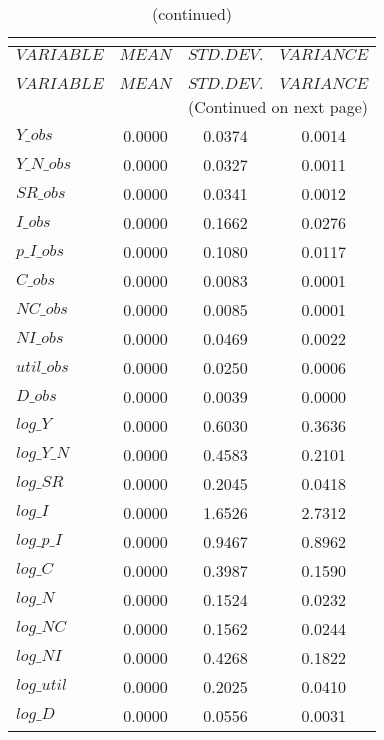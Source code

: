  
\begin{center}
\begin{longtable}{lccc} 
\caption{THEORETICAL MOMENTS}\\
 \label{Table:th_moments}\\
\toprule 
$VARIABLE   $	 & 	 $         MEAN$	 & 	 $    STD. DEV.$	 & 	 $     VARIANCE$\\
\midrule \endfirsthead 
\caption{(continued)}\\
 \toprule \\ 
$VARIABLE   $	 & 	 $         MEAN$	 & 	 $    STD. DEV.$	 & 	 $     VARIANCE$\\
\midrule \endhead 
\midrule \multicolumn{4}{r}{(Continued on next page)} \\ \bottomrule \endfoot 
\bottomrule \endlastfoot 
$Y\_obs     $	 & 	       0.0000	 & 	       0.0374	 & 	       0.0014 \\ 
$Y\_N\_obs  $	 & 	       0.0000	 & 	       0.0327	 & 	       0.0011 \\ 
$SR\_obs    $	 & 	       0.0000	 & 	       0.0341	 & 	       0.0012 \\ 
$I\_obs     $	 & 	       0.0000	 & 	       0.1662	 & 	       0.0276 \\ 
$p\_I\_obs  $	 & 	       0.0000	 & 	       0.1080	 & 	       0.0117 \\ 
$C\_obs     $	 & 	       0.0000	 & 	       0.0083	 & 	       0.0001 \\ 
$NC\_obs    $	 & 	       0.0000	 & 	       0.0085	 & 	       0.0001 \\ 
$NI\_obs    $	 & 	       0.0000	 & 	       0.0469	 & 	       0.0022 \\ 
$util\_obs  $	 & 	       0.0000	 & 	       0.0250	 & 	       0.0006 \\ 
$D\_obs     $	 & 	       0.0000	 & 	       0.0039	 & 	       0.0000 \\ 
$log\_Y     $	 & 	       0.0000	 & 	       0.6030	 & 	       0.3636 \\ 
$log\_Y\_N  $	 & 	       0.0000	 & 	       0.4583	 & 	       0.2101 \\ 
$log\_SR    $	 & 	       0.0000	 & 	       0.2045	 & 	       0.0418 \\ 
$log\_I     $	 & 	       0.0000	 & 	       1.6526	 & 	       2.7312 \\ 
$log\_p\_I  $	 & 	       0.0000	 & 	       0.9467	 & 	       0.8962 \\ 
$log\_C     $	 & 	       0.0000	 & 	       0.3987	 & 	       0.1590 \\ 
$log\_N     $	 & 	       0.0000	 & 	       0.1524	 & 	       0.0232 \\ 
$log\_NC    $	 & 	       0.0000	 & 	       0.1562	 & 	       0.0244 \\ 
$log\_NI    $	 & 	       0.0000	 & 	       0.4268	 & 	       0.1822 \\ 
$log\_util  $	 & 	       0.0000	 & 	       0.2025	 & 	       0.0410 \\ 
$log\_D     $	 & 	       0.0000	 & 	       0.0556	 & 	       0.0031 \\ 
\end{longtable}
 \end{center}
